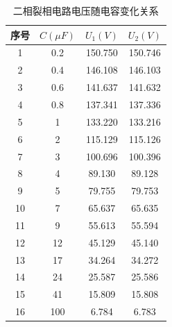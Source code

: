 \documentclass[12pt]{article}%
\begin{document}
\twocolumn
\begin{table}[htbp]
  \centering
  \caption{\heiti{}二相裂相电路电压随电容变化关系}
    \begin{tabular}{cccc}
    \hline
   序号& $C(\mu F)$  & $U_1(V) $& $U_2(V)$ \\
        \hline
    1  & 0.2 & 150.750  & 150.746  \\
    2  & 0.4 & 146.108  & 146.103  \\
    3  & 0.6 & 141.637  & 141.632  \\
    4  & 0.8 & 137.341  & 137.336  \\
    5  & 1  & 133.220  & 133.216  \\
    6  & 2  & 115.129  & 115.126  \\
    7  & 3  & 100.696  & 100.396  \\
    8  & 4  & 89.130  & 89.128  \\
    9  & 5  & 79.755  & 79.753  \\
    10 & 7  & 65.637  & 65.635  \\
    11 & 9  & 55.613  & 55.594  \\
    12 & 12 & 45.129  & 45.140  \\
    13 & 17 & 34.264  & 34.272  \\
    14 & 24 & 25.587  & 25.586  \\
    15 & 41 & 15.809  & 15.808  \\
    16 & 100 & 6.784  & 6.783  \\
     \hline
    \end{tabular}%
  \label{tab:addlabel2}%
\end{table}%
\end{document}
